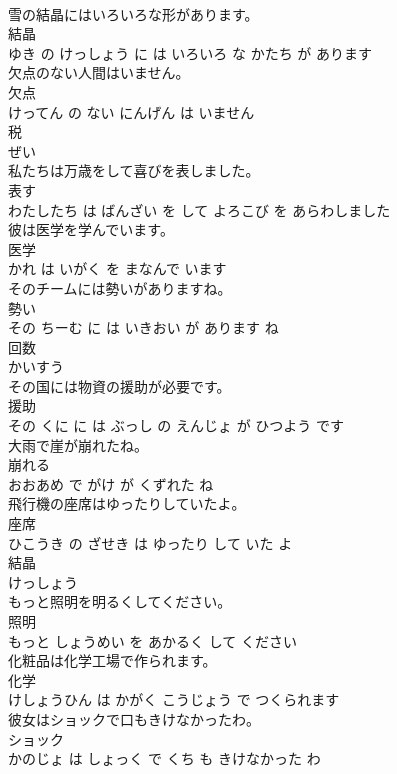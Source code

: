 \documentclass[8pt]{extreport}
\begin{document}
\begin{CJK}{UTF8}{min}
\\	雪の結晶にはいろいろな形があります。	
\\	結晶 
\\	ゆき の けっしょう に は いろいろ な かたち が あります			
\\	欠点のない人間はいません。	
\\	欠点 
\\	けってん の ない にんげん は いません			
\\	税	
\\	ぜい			
\\	私たちは万歳をして喜びを表しました。	
\\	表す 
\\	わたしたち は ばんざい を して よろこび を あらわしました			
\\	彼は医学を学んでいます。	
\\	医学 
\\	かれ は いがく を まなんで います			
\\	そのチームには勢いがありますね。	
\\	勢い 
\\	その ちーむ に は いきおい が あります ね			
\\	回数	
\\	かいすう			
\\	その国には物資の援助が必要です。	
\\	援助 
\\	その くに に は ぶっし の えんじょ が ひつよう です			
\\	大雨で崖が崩れたね。	
\\	崩れる 
\\	おおあめ で がけ が くずれた ね			
\\	飛行機の座席はゆったりしていたよ。	
\\	座席 
\\	ひこうき の ざせき は ゆったり して いた よ			
\\	結晶	
\\	けっしょう			
\\	もっと照明を明るくしてください。	
\\	照明 
\\	もっと しょうめい を あかるく して ください			
\\	化粧品は化学工場で作られます。	
\\	化学 
\\	けしょうひん は かがく こうじょう で つくられます			
\\	彼女はショックで口もきけなかったわ。	
\\	ショック 
\\	かのじょ は しょっく で くち も きけなかった わ			

\end{CJK}
\end{document}
